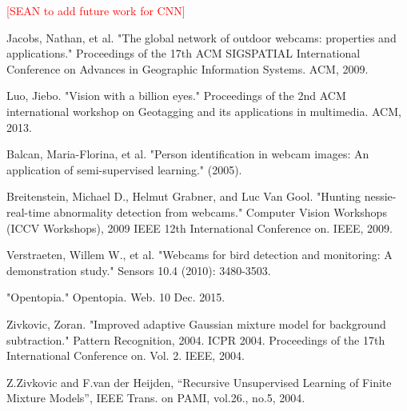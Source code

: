 \documentclass[10pt]{article} %
\begin{document}
\textcolor{red}{[SEAN to add future work for CNN]}


\begin{thebibliography}{9}
Jacobs, Nathan, et al. "The global network of outdoor webcams: properties and applications." Proceedings of the 17th ACM SIGSPATIAL International Conference on Advances in Geographic Information Systems. ACM, 2009.

Luo, Jiebo. "Vision with a billion eyes." Proceedings of the 2nd ACM international workshop on Geotagging and its applications in multimedia. ACM, 2013.

Balcan, Maria-Florina, et al. "Person identification in webcam images: An application of semi-supervised learning." (2005).

Breitenstein, Michael D., Helmut Grabner, and Luc Van Gool. "Hunting nessie-real-time abnormality detection from webcams." Computer Vision Workshops (ICCV Workshops), 2009 IEEE 12th International Conference on. IEEE, 2009.

Verstraeten, Willem W., et al. "Webcams for bird detection and monitoring: A demonstration study." Sensors 10.4 (2010): 3480-3503.

"Opentopia." Opentopia. Web. 10 Dec. 2015.

Zivkovic, Zoran. "Improved adaptive Gaussian mixture model for background subtraction." Pattern Recognition, 2004. ICPR 2004. Proceedings of the 17th International Conference on. Vol. 2. IEEE, 2004.

Z.Zivkovic and F.van der Heijden, “Recursive Unsupervised Learning of Finite Mixture Models”, IEEE Trans. on PAMI, vol.26., no.5, 2004.

\end{thebibliography}
\end{document}
